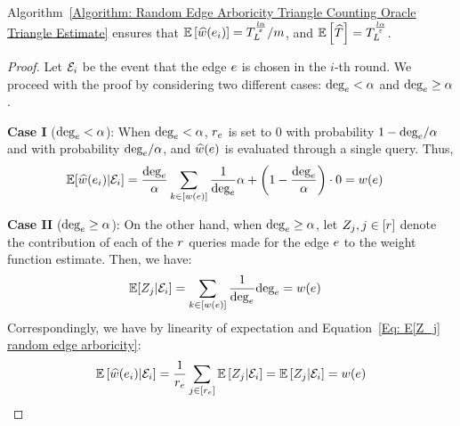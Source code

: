 \begin{lemma}\label{lemma: E[Y_I] Weight Func Algo}
    Algorithm~\ref{Algorithm: Random Edge Arboricity Triangle Counting Oracle Triangle Estimate} ensures that $\operatorname*{\mathbb{E}}\left[{\widehat{w}(e_i)}\right] = T^{\frac{l\alpha}{\varepsilon}}_{L}/m $, and $\operatorname*{\mathbb{E}}\left[{\widehat{T}}\right] = T^{\frac{l\alpha}{\varepsilon}}_{L}$.
    \begin{proof}
    Let $\mathcal{E}_i$ be the event that the edge $e$ is chosen in the $i$-th round. We proceed with the proof by considering two different cases: $\mbox{deg}_{e} < \alpha$ and $\mbox{deg}_{e} \geq \alpha$. 
    
    
    {\bf Case I }($\mbox{deg}_{e} < \alpha$):
    When $\mbox{deg}_{e} < \alpha$, $r_e$ is set to $0$ with probability $1 - \mbox{deg}_{e}/\alpha$ and  with probability $\mbox{deg}_{e}/\alpha$, and $\widehat{w}(e)$ is evaluated through a single query. Thus, \begin{align}
        \operatorname*{\mathbb{E}}[\widehat{w}(e_i)|\mathcal{E}_i] &= \frac{\mbox{deg}_{e}}{\alpha} \sum_{k \in [w(e)]} \frac{1}{\mbox{deg}_{e}} \alpha + \left({1 - \frac{\mbox{deg}_{e}}{\alpha}}\right)\cdot0 = w(e)\label{Eq: E[what(e)] low degree edge}
    \end{align}

     
    {\bf Case II }($\mbox{deg}_{e} \geq \alpha$):
    On the other hand, when $\mbox{deg}_{e} \geq \alpha$, let $Z_j, j \in [r]$ denote the contribution of each of the $r$ queries made for the edge $e$ to the weight function estimate. Then, we have:
    \begin{align}
        \operatorname*{\mathbb{E}}[Z_j|\mathcal{E}_i] &= \sum_{k \in [w(e)]} \frac{1}{\mbox{deg}_{e}} \mbox{deg}_{e}= w(e)\label{Eq: E[Z_j] random edge arboricity}
    \end{align}
    Correspondingly, we have by linearity of expectation and Equation~\ref{Eq: E[Z_j] random edge arboricity}:
    \begin{align}
        \operatorname*{\mathbb{E}}\left[{\widehat{w}(e_i)|\mathcal{E}_i}\right] = \frac{1}{r_e}\sum_{j \in [r_{e}]} \operatorname*{\mathbb{E}}\left[{Z_j|\mathcal{E}_i}\right] = \operatorname*{\mathbb{E}}\left[{Z_j|\mathcal{E}_i}\right] = w(e)\label{Eq: E[what(e)] high degree edge}
    \end{align}


\end{proof}
\end{lemma}
